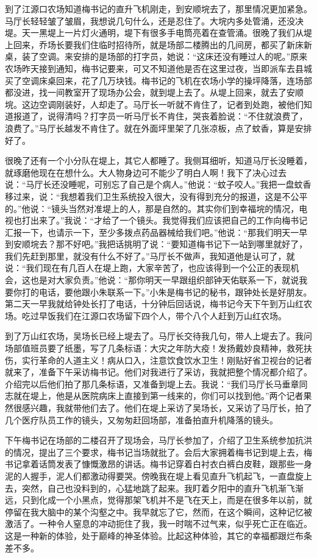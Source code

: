 \documentclass[12pt,oneside]{book}
\begin{document}
到了江源口农场知道梅书记的直升飞机刚走，到安顺垸去了，那里情况更加紧急。马厅长轻轻皱了皱眉，我想说几句什么，还是忍住了。大垸内多处管涌，还没决堤。天一黑堤上一片灯火通明，堤下有很多手电筒亮着在查管涌。很晚了我们从堤上回来，乔场长要我们住临时招待所，就是场部二楼腾出的几间房，都买了新床新桌，装了空调。来安排的是场部的打字员，她说：``这床还没有睡过人的呢。''原来农场昨天接到通知，梅书记要来，可又不知道他是否在这里过夜，当即派车去县城买了空调床桌回来，花了几万块钱。梅书记的飞机在农场小学的操坪降落，连场部都没进，找一间教室开了现场办公会，就到堤上去了。从堤上回来，就去了安顺垸。这边空调刚装好，人却走了。马厅长一听就不肯住了，记者到处跑，被他们知道报道了，说得清吗？打字员一听马厅长不肯住，哭丧着脸说：``不住就浪费了，浪费了。''马厅长越发不肯住了。就在外面坪里架了几张凉板，点了蚊香，算是安排好了。

很晚了还有一个小分队在堤上，其它人都睡了。我侧耳细听，知道马厅长没睡着，就琢磨他现在在想什么。大人物身边可不能少了明白人啊！我下了决心过去说：``马厅长还没睡呢，可别忘了自己是个病人。''他说：``蚊子咬人。''我把一盘蚊香移过来，说：``我想着我们卫生系统投入很大，没有得到充分的报道，这是不公平的。''他说：``镜头当然对准堤上的人，那是自然的。其实你们到幸福垸的情况，电视也打出来了。''我说：``才给了一个镜头。我觉得我们应该把自己的工作向梅书记汇报一下，也请示一下，至少多拨点药品器械给我们吧。''他说：``那我们明天一早到安顺垸去？那不好吧。''我把话挑明了说：``要知道梅书记下一站到哪里就好了，我们先赶到那里，就没有什么不好了。''马厅长不做声，我知道他是认可了，就说：``我们现在有几百人在堤上跑，大家辛苦了，也应该得到一个公正的表现机会，这也是对大家负责。''他说：``那你明天一早跟组织部钟天佑联系一下，就说我要你打的电话，要他跟小朱联系一下。''小朱是梅书记的秘书，跟钟处长是好朋友。第二天一早我就给钟处长打了电话，十分钟后回话说，梅书记今天下午到万山红农场。吃过早饭我们在江源口农场留下四个人，带个八个人赶到万山红农场。

到了万山红农场，吴场长已经上堤去了。马厅长交待我几句，带人上堤去了。我问场部值班员要了纸墨，写了几条标语：大灾之年防大疫！发扬戴妙良精神，救死扶伤，实行革命的人道主义！病从口入，注意饮食饮水卫生！刚贴好省卫视台的记者就来了，准备下午采访梅书记。他们对我进行了采访，我就把整个情况都介绍了。介绍完以后他们拍了那几条标语，又准备到堤上去。我说：``我们马厅长马垂章同志就在堤上，他是从医院病床上直接到第一线来的，你们可以找到他。''两个记者果然很感兴趣，我就带他们去了。他们在堤上采访了吴场长，又采访了马厅长，拍了几个医疗队员工作的镜头，又匆匆赶回场部，准备拍直升机降落的镜头。

下午梅书记在场部的二楼召开了现场会，马厅长参加了，介绍了卫生系统参加抗洪的情况，提出了三个要求，梅书记当场就批了。会后大家拥着梅书记到堤上去，梅书记拿着话筒发表了慷慨激昂的讲话。梅书记穿着白衬衣白裤白皮鞋，跟那些一身泥的人握手，泥人们都激动得要哭。傍晚我在堤上看见直升飞机起飞，一直盘旋上去，突然，自己也没料到的，心猛地跳了起来。我盯着夕阳中的直升飞机渐飞渐远，只到化成一个小黑点，觉得那架飞机并不是飞在天上，而是在很多年以前，就停留在我大脑中的某个沟壑之中。我早就忘了它，然而，在这个瞬间，这种记忆被激活了。一种令人窒息的冲动扼住了我，我一时喘不过气来，似乎死亡正在临近。这是一种新的体验，处于巅峰的神圣体验。比起这种体验，其它的幸福都跟烂布条差不多。
\end{document}
